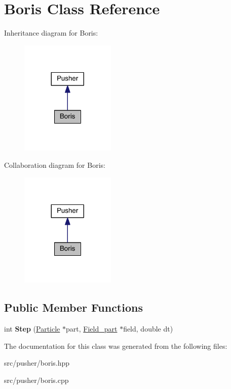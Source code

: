 \hypertarget{class_boris}{}\section{Boris Class Reference}
\label{class_boris}


Inheritance diagram for Boris\+:\nopagebreak
\begin{figure}[H]
\begin{center}
\leavevmode
\includegraphics[width=128pt]{class_boris__inherit__graph}
\end{center}
\end{figure}


Collaboration diagram for Boris\+:\nopagebreak
\begin{figure}[H]
\begin{center}
\leavevmode
\includegraphics[width=128pt]{class_boris__coll__graph}
\end{center}
\end{figure}
\subsection*{Public Member Functions}
\begin{DoxyCompactItemize}
\item 
\hypertarget{class_boris_a1cf5027803211109530e12ddd434ef5c}{}\label{class_boris_a1cf5027803211109530e12ddd434ef5c} 
int {\bfseries Step} (\hyperlink{struct_particle}{Particle} $\ast$part, \hyperlink{struct_field__part}{Field\+\_\+part} $\ast$field, double dt)
\end{DoxyCompactItemize}


The documentation for this class was generated from the following files\+:\begin{DoxyCompactItemize}
\item 
src/pusher/boris.\+hpp\item 
src/pusher/boris.\+cpp\end{DoxyCompactItemize}

